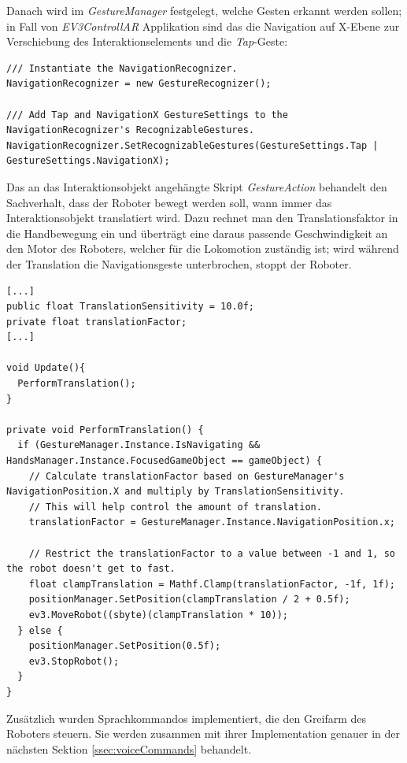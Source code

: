 Danach wird im \textit{GestureManager} festgelegt, welche Gesten erkannt werden sollen; in Fall von \textit{EV3ControllAR} Applikation sind das die Navigation auf X-Ebene zur Verschiebung des Interaktionselements und die \textit{Tap}-Geste:
\begin{lstlisting}
/// Instantiate the NavigationRecognizer.
NavigationRecognizer = new GestureRecognizer();

/// Add Tap and NavigationX GestureSettings to the NavigationRecognizer's RecognizableGestures.
NavigationRecognizer.SetRecognizableGestures(GestureSettings.Tap | GestureSettings.NavigationX);
\end{lstlisting}
Das an das Interaktionsobjekt angehängte Skript \textit{GestureAction} behandelt den Sachverhalt, dass der Roboter bewegt werden soll, wann immer das Interaktionsobjekt translatiert wird. Dazu rechnet man den Translationsfaktor in die Handbewegung ein und überträgt eine daraus passende Geschwindigkeit an den Motor des Roboters, welcher für die Lokomotion zuständig ist; wird während der Translation die Navigationsgeste unterbrochen, stoppt der Roboter.
\begin{lstlisting}
[...]
public float TranslationSensitivity = 10.0f;
private float translationFactor;   
[...]    

void Update(){      
  PerformTranslation();   
}     

private void PerformTranslation() {         
  if (GestureManager.Instance.IsNavigating && HandsManager.Instance.FocusedGameObject == gameObject) {             
	// Calculate translationFactor based on GestureManager's NavigationPosition.X and multiply by TranslationSensitivity.             
	// This will help control the amount of translation.             
	translationFactor = GestureManager.Instance.NavigationPosition.x;          

	// Restrict the translationFactor to a value between -1 and 1, so the robot doesn't get to fast.
	float clampTranslation = Mathf.Clamp(translationFactor, -1f, 1f);      
	positionManager.SetPosition(clampTranslation / 2 + 0.5f);
	ev3.MoveRobot((sbyte)(clampTranslation * 10));         
  } else {             
	positionManager.SetPosition(0.5f);             
	ev3.StopRobot();         
  }     
} 
\end{lstlisting}
Zusätzlich wurden Sprachkommandos implementiert, die den Greifarm des Roboters steuern. Sie werden zusammen mit ihrer Implementation genauer in der nächsten Sektion \ref{ssec:voiceCommands} behandelt.
